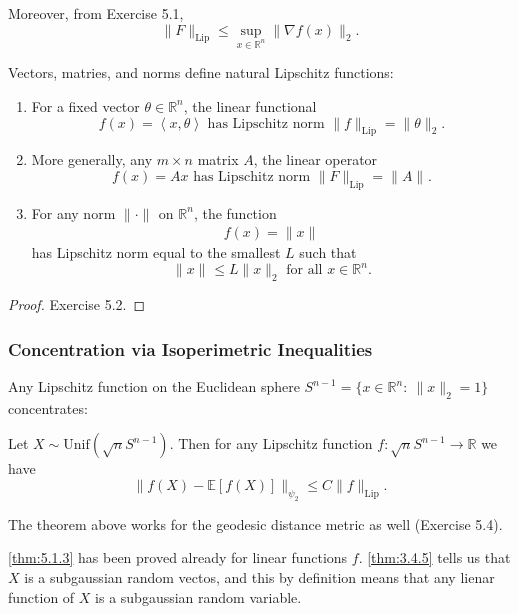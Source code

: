 Moreover, from Exercise 5.1,
\[ \lVert F \rVert_{\mathrm{Lip}} \leq \sup_{x \in \mathbb{R}^n} \lVert \nabla f(x) \rVert_{2}. \]

\begin{example}[]
\label{ex:5.1.2}
Vectors, matries, and norms define natural Lipschitz functions:
\begin{enumerate}
	\item For a fixed vector $\theta \in \mathbb{R}^n$, the linear functional 
	\[ f(x) = \left\langle x, \theta \right\rangle \text{ has Lipschitz norm } 
	\lVert f \rVert_{\mathrm{Lip}} = \lVert \theta \rVert_{2}. \]
	\item More generally, any $m \times n$ matrix $A$, the linear operator 
	\[ f(x) = Ax \text{ has Lipschitz norm } \lVert F \rVert_{\mathrm{Lip}} = \lVert A \rVert_{}. \]
	\item For any norm $\lVert \cdot \rVert_{}$ on $\mathbb{R}^n$, the function 
	\[ f(x) = \lVert x \rVert_{} \]
	has Lipschitz norm equal to the smallest $L$ such that 
	\[ \lVert x \rVert_{} \leq L \lVert x \rVert_{2} \text{ for all } x \in \mathbb{R}^n. \]
\end{enumerate}
\end{example}

\begin{proof}
Exercise 5.2.
\end{proof}


\subsubsection{Concentration via Isoperimetric Inequalities}
Any Lipschitz function on the Euclidean sphere $S^{n - 1} = \{x \in \mathbb{R}^n: \ \lVert x \rVert_{2} = 1\}$ 
concentrates:

\begin{theorem}[]
\label{thm:5.1.3}
Let $X \sim \mathrm{Unif}(\sqrt{n}S^{n - 1})$. Then for any Lipschitz function $f: \sqrt{n}S^{n - 1} \to 
\mathbb{R}$ we have 
\[ \lVert f(X) - \mathbb{E}[f(X)] \rVert_{\psi_2} \leq C \lVert f \rVert_{\mathrm{Lip}}. \]
\end{theorem}

The theorem above works for the geodesic distance metric as well (Exercise 5.4).

\cref{thm:5.1.3} has been proved already for linear functions $f$. \cref{thm:3.4.5} tells us that $X$ is a 
subgaussian random vectos, and this by definition means that any lienar function of $X$ is a subgaussian 
random variable. 

